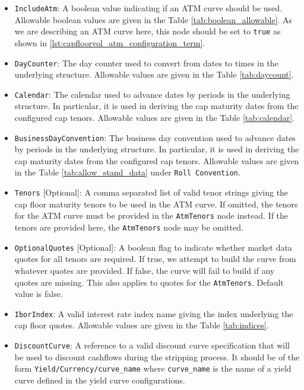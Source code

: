 \begin{itemize}
\item \lstinline!IncludeAtm!:
A boolean value indicating if an ATM curve should be used. Allowable boolean values are given in the Table \ref{tab:boolean_allowable}. As we are describing an ATM curve here, this node should be set to \lstinline!true! as shown in \ref{lst:capfloorvol_atm_configuration_term}.

\item \lstinline!DayCounter!:
The day counter used to convert from dates to times in the underlying structure. Allowable values are given in the Table \ref{tab:daycount}.

\item \lstinline!Calendar!:
The calendar used to advance dates by periods in the underlying structure. In particular, it is used in deriving the cap maturity dates from the configured cap tenors. Allowable values are given in the Table \ref{tab:calendar}.

\item \lstinline!BusinessDayConvention!:
The business day convention used to advance dates by periods in the underlying structure. In particular, it is used in deriving the cap maturity dates from the configured cap tenors. Allowable values are given in the Table \ref{tab:allow_stand_data} under \lstinline!Roll Convention!.

\item \lstinline!Tenors! [Optional]:
A comma separated list of valid tenor strings giving the cap floor maturity tenors to be used in the ATM curve. If omitted, the tenors for the ATM curve must be provided in the \lstinline!AtmTenors! node instead. If the tenors are provided here, the \lstinline!AtmTenors! node may be omitted.

\item \lstinline!OptionalQuotes! [Optional]:
A boolean flag to indicate whether market data quotes for all tenors are required. If true, we attempt to build the curve from whatever quotes are provided. If false, the curve will fail to build if any quotes are missing. This also applies to quotes for the \lstinline!AtmTenors!. Default value is false.

\item \lstinline!IborIndex!:
A valid interest rate index name giving the index underlying the cap floor quotes. Allowable values are given in the Table \ref{tab:indices}.

\item \lstinline!DiscountCurve!:
A reference to a valid discount curve specification that will be used to discount cashflows during the stripping process. It should be of the form \lstinline!Yield/Currency/curve_name! where \lstinline!curve_name! is the name of a yield curve defined in the yield curve configurations.


\end{itemize}

